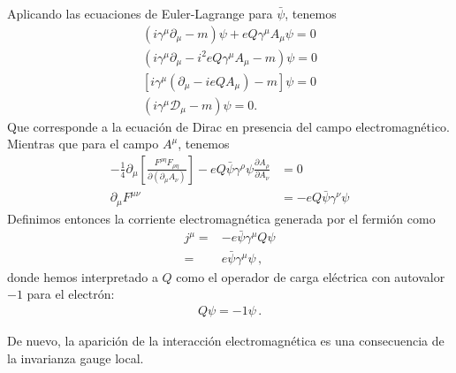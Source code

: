 \begin{frame}
Aplicando las ecuaciones de Euler-Lagrange para $\bar{\psi}$, tenemos
\begin{align}
  (i\gamma^\mu\partial_\mu-m)\psi+eQ\gamma^\mu A_\mu\psi=0\nonumber\\
  (i\gamma^\mu\partial_\mu-i^2eQ\gamma^\mu A_\mu-m)\psi=0\nonumber\\
  [i\gamma^\mu(\partial_\mu-ieQA_\mu)-m]\psi=0\nonumber\\
  (i\gamma^\mu\mathcal{D}_\mu-m)\psi=0.
\end{align}
Que corresponde a la ecuación de Dirac en presencia del campo electromagnético. Mientras que para el campo $A^\mu$, tenemos
\begin{align}
  -\frac{1}{4}\partial_\mu\left[\frac{F^{\rho\eta}F_{\rho\eta}}{\partial\left(\partial_\mu A_\nu\right)}\right]-eQ\bar{\psi}\gamma^\rho\psi\frac{\partial A_\rho}{\partial A_\nu}&=0\nonumber\\
  \partial_\mu F^{\mu\nu}&=-eQ\bar{\psi}\gamma^\nu\psi
\end{align}
Definimos entonces la corriente electromagnética generada por el fermión como
\begin{align}
  \label{eq:222qft}
  j^\mu=&-e\bar{\psi}\gamma^\mu Q\psi \nonumber\\
       =&e\bar{\psi}\gamma^\mu\psi \,,
\end{align}
donde hemos interpretado a $Q$ como el operador de carga eléctrica con autovalor $-1$ para el electrón:
\begin{align}
  Q\psi =-1\psi\,.
\end{align}

De nuevo, la aparición de la interacción electromagnética es una consecuencia de la invarianza gauge local. 
\end{frame}

